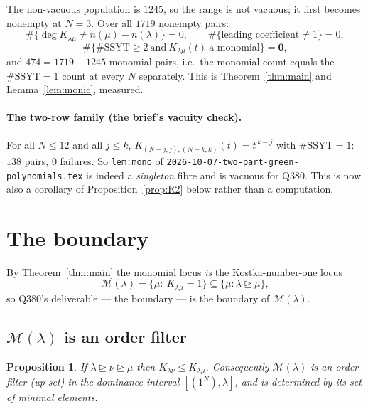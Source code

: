 \documentclass[11pt]{article}
\theoremstyle{plain}
\newtheorem{proposition}[theorem]{Proposition}
\theoremstyle{definition}
\newcommand{\SSYT}{\mathrm{SSYT}}
\DeclareMathOperator{\dom}{\trianglerighteq}
\begin{document}
The non-vacuous population is $1245$, so the range is not vacuous; it first becomes
nonempty at $N=3$.  Over all $1719$ nonempty pairs:
\[
 \#\{\deg K_{\lambda\mu}\ne n(\mu)-n(\lambda)\}=0,\qquad
 \#\{\text{leading coefficient}\ne1\}=0,
\]
\[
 \#\{\#\SSYT\ge2 \ \text{and}\ K_{\lambda\mu}(t)\ \text{a monomial}\}=\mathbf{0},
\]
and $474=1719-1245$ monomial pairs, i.e.\ the monomial count equals the $\#\SSYT=1$ count
at every $N$ separately.  This is Theorem~\ref{thm:main} and Lemma~\ref{lem:monic},
measured.

\paragraph{The two-row family (the brief's vacuity check).}  For all $N\le12$ and all
$j\le k$, $K_{(N-j,j),(N-k,k)}(t)=t^{\,k-j}$ with $\#\SSYT=1$: $138$ pairs, $0$ failures.
So \texttt{lem:mono} of \texttt{2026-10-07-two-part-green-polynomials.tex} is indeed a
\emph{singleton} fibre and is vacuous for Q380.  This is now also a corollary of
Proposition~\ref{prop:R2} below rather than a computation.

\section{The boundary}\label{sec:boundary}

By Theorem~\ref{thm:main} the monomial locus \emph{is} the Kostka-number-one locus
\[
  \mathcal{M}(\lambda)=\{\mu:\ K_{\lambda\mu}=1\}\subseteq\{\mu:\lambda\dom\mu\},
\]
so Q380's deliverable --- the boundary --- is the boundary of $\mathcal M(\lambda)$.

\subsection{$\mathcal M(\lambda)$ is an order filter}

\begin{proposition}\label{prop:filter}
If $\lambda\dom\nu\dom\mu$ then $K_{\lambda\nu}\le K_{\lambda\mu}$.  Consequently
$\mathcal M(\lambda)$ is an order filter (up-set) in the dominance interval
$[(1^N),\lambda]$, and is determined by its set of minimal elements.
\end{proposition}
\end{document}
